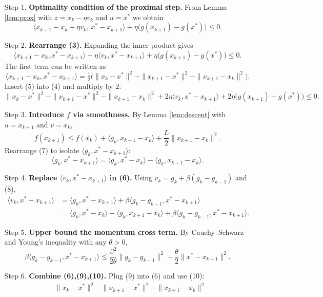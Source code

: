 \documentclass{article}
\begin{document}
\begin{enumerate}
\item[Step 1.] \textbf{Optimality condition of the proximal step.}  
From Lemma \ref{lem:prox} with $z = x_{k}-\eta v_{k}$ and $u=x^{*}$ we obtain
\[
\big\langle x_{k+1}-x_{k}+\eta v_{k},\,x^{*}-x_{k+1}\big\rangle
    +\eta\bigl(g(x_{k+1})-g(x^{*})\bigr)\le 0.
\tag{3}
\]
\item[Step 2.] \textbf{Rearrange (3).}  
Expanding the inner product gives
\[
\langle x_{k+1}-x_{k},x^{*}-x_{k+1}\rangle
   +\eta\langle v_{k},x^{*}-x_{k+1}\rangle
   +\eta\bigl(g(x_{k+1})-g(x^{*})\bigr)\le 0.
\tag{4}
\]
The first term can be written as
\[
\langle x_{k+1}-x_{k},x^{*}-x_{k+1}\rangle
   =\tfrac12\bigl(\|x_{k}-x^{*}\|^{2}-\|x_{k+1}-x^{*}\|^{2}-\|x_{k+1}-x_{k}\|^{2}\bigr).
\tag{5}
\]
Insert (5) into (4) and multiply by $2$:
\[
\|x_{k}-x^{*}\|^{2}-\|x_{k+1}-x^{*}\|^{2}
   -\|x_{k+1}-x_{k}\|^{2}
   +2\eta\langle v_{k},x^{*}-x_{k+1}\rangle
   +2\eta\bigl(g(x_{k+1})-g(x^{*})\bigr)\le0.
\tag{6}
\]
\item[Step 3.] \textbf{Introduce $f$ via smoothness.}  
By Lemma \ref{lem:descent} with $u=x_{k+1}$ and $v=x_{k}$,
\[
f(x_{k+1})\le f(x_{k})+\langle g_{k},x_{k+1}-x_{k}\rangle+\frac{L}{2}\|x_{k+1}-x_{k}\|^{2}.
\tag{7}
\]
Rearrange (7) to isolate $\langle g_{k},x^{*}-x_{k+1}\rangle$:
\[
\langle g_{k},x^{*}-x_{k+1}\rangle
   =\langle g_{k},x^{*}-x_{k}\rangle-\langle g_{k},x_{k+1}-x_{k}\rangle.
\tag{8}
\]
\item[Step 4.] \textbf{Replace $\langle v_{k},x^{*}-x_{k+1}\rangle$ in (6).}  
Using $v_{k}=g_{k}+\beta(g_{k}-g_{k-1})$ and (8),
\[
\begin{aligned}
\langle v_{k},x^{*}-x_{k+1}\rangle
&= \langle g_{k},x^{*}-x_{k+1}\rangle
   +\beta\langle g_{k}-g_{k-1},x^{*}-x_{k+1}\rangle\\
&= \langle g_{k},x^{*}-x_{k}\rangle
   -\langle g_{k},x_{k+1}-x_{k}\rangle
   +\beta\langle g_{k}-g_{k-1},x^{*}-x_{k+1}\rangle .
\end{aligned}
\tag{9}
\]
\item[Step 5.] \textbf{Upper bound the momentum cross term.}  
By Cauchy–Schwarz and Young’s inequality with any $\theta>0$,
\[
\beta\langle g_{k}-g_{k-1},x^{*}-x_{k+1}\rangle
\le
\frac{\beta^{2}}{2\theta}\|g_{k}-g_{k-1}\|^{2}
+\frac{\theta}{2}\|x^{*}-x_{k+1}\|^{2}.
\tag{10}
\]
\item[Step 6.] \textbf{Combine (6),(9),(10).}  
Plug (9) into (6) and use (10):
\[
\begin{aligned}
&\|x_{k}-x^{*}\|^{2}-\|x_{k+1}-x^{*}\|^{2}
   -\|x_{k+1}-x_{k}\|^{2}\\

\end{aligned}\]
\end{enumerate}
\end{document}
